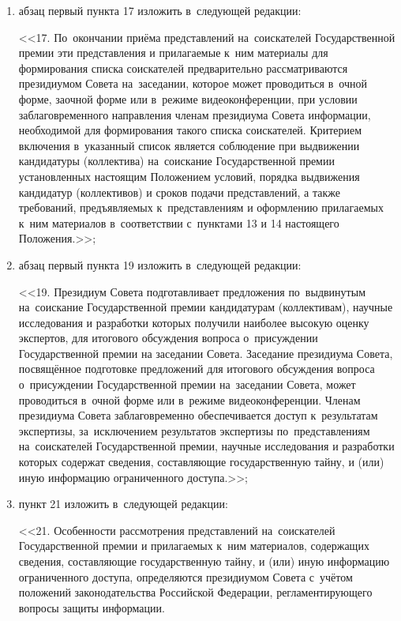 \documentclass[14pt, a4paper]{extarticle}
\begin{document}
\begin{enumerate}
\begin{enumerate}[label=\asbuk*), ref=\asbuk*]
		\item абзац первый пункта 17 изложить в~следующей редакции:
		
		<<17. По~окончании приёма представлений на~соискателей Государственной премии эти представления и прилагаемые к~ним материалы для формирования списка соискателей предварительно рассматриваются президиумом Совета на~заседании, которое может проводиться в~очной форме, заочной форме или в~режиме видеоконференции, при условии заблаговременного направления членам президиума Совета информации, необходимой для формирования такого списка соискателей. Критерием включения в~указанный список является соблюдение при выдвижении кандидатуры (коллектива) на~соискание Государственной премии установленных настоящим Положением условий, порядка выдвижения кандидатур (коллективов) и сроков подачи представлений, а также требований, предъявляемых к~представлениям и оформлению прилагаемых к~ним материалов в~соответствии с~пунктами 13 и 14 настоящего Положения.>>;
		
		\item абзац первый пункта 19 изложить в~следующей редакции:
		
		<<19. Президиум Совета подготавливает предложения по~выдвинутым на~соискание Государственной премии кандидатурам (коллективам), научные исследования и разработки которых получили наиболее высокую оценку экспертов, для итогового обсуждения вопроса о~присуждении Государственной премии на заседании Совета. Заседание президиума Совета, посвящённое подготовке предложений для итогового обсуждения вопроса о~присуждении Государственной премии на~заседании Совета, может проводиться в~очной форме или в~режиме видеоконференции. Членам президиума Совета заблаговременно обеспечивается доступ к~результатам экспертизы, за~исключением результатов экспертизы по~представлениям на~соискателей Государственной премии, научные исследования и разработки которых содержат сведения, составляющие государственную тайну, и (или) иную информацию ограниченного доступа.>>;
		
		\item пункт 21 изложить в~следующей редакции:
		
		<<21. Особенности рассмотрения представлений на~соискателей Государственной премии и прилагаемых к~ним материалов, содержащих сведения, составляющие государственную тайну, и (или) иную информацию ограниченного доступа, определяются президиумом Совета с~учётом положений законодательства Российской Федерации, регламентирующего вопросы защиты информации.
		

\end{enumerate}
\end{enumerate}
\end{document}
